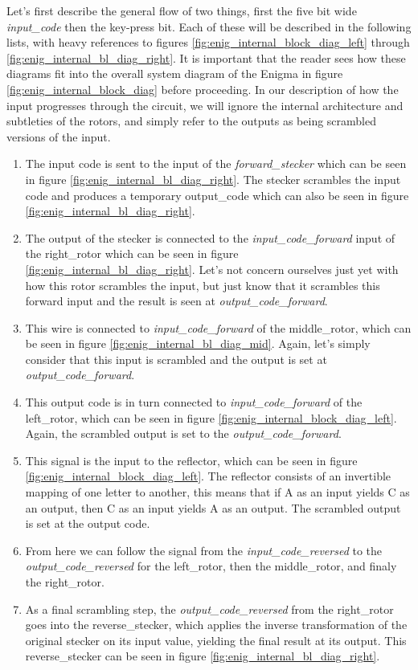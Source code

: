 \documentclass{article}
\begin{document}
Let's first describe the general flow of two things, first the five bit wide \textit{input\_code} then the key-press bit. Each of these will be described in the following lists, with heavy references to figures \ref{fig:enig_internal_block_diag_left} through \ref{fig:enig_internal_bl_diag_right}. It is important that the reader sees how these diagrams fit into the overall system diagram of the Enigma in figure \ref{fig:enig_internal_block_diag} before proceeding. In our description of how the input progresses through the circuit, we will ignore the internal architecture and subtleties of the rotors, and simply refer to the outputs as being scrambled versions of the input. 
\begin{enumerate}
    \item The input code is sent to the input of the \textit{forward\_stecker} which can be seen in figure \ref{fig:enig_internal_bl_diag_right}. The stecker scrambles the input code and produces a temporary output\_code which can also be seen in figure \ref{fig:enig_internal_bl_diag_right}.
    \item The output of the stecker is connected to the \textit{input\_code\_forward} input of the right\_rotor which can be seen in figure \ref{fig:enig_internal_bl_diag_right}. Let's not concern ourselves just yet with how this rotor scrambles the input, but just know that it scrambles this forward input and the result is seen at \textit{output\_code\_forward}.
    \item This wire is connected to \textit{input\_code\_forward} of the middle\_rotor, which can be seen in figure \ref{fig:enig_internal_bl_diag_mid}. Again, let's simply consider that this input is scrambled and the output is set at \textit{output\_code\_forward}.
    \item This output code is in turn connected to \textit{input\_code\_forward} of the left\_rotor, which can be seen in figure \ref{fig:enig_internal_block_diag_left}. Again, the scrambled output is set to the \textit{output\_code\_forward}. 
    \item This signal is the input to the reflector, which can be seen in figure \ref{fig:enig_internal_block_diag_left}. The reflector consists of an invertible mapping of one letter to another, this means that if A as an input yields C as an output, then C as an input yields A as an output. The scrambled output is set at the output code. 
    \item From here we can follow the signal from the \textit{input\_code\_reversed} to the \textit{output\_code\_reversed} for the left\_rotor, then the middle\_rotor, and finaly the right\_rotor. 
    \item As a final scrambling step, the \textit{output\_code\_reversed} from the right\_rotor goes into the reverse\_stecker, which applies the inverse transformation of the original stecker on its input value, yielding the final result at its output. This reverse\_stecker can be seen in figure \ref{fig:enig_internal_bl_diag_right}.
\end{enumerate}
\end{document}
